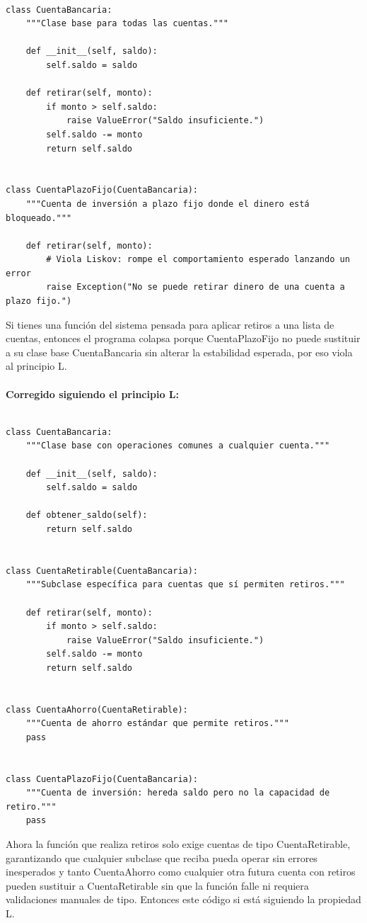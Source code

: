 \documentclass{article}
\begin{document}
        		\begin{verbatim}

class CuentaBancaria:
    """Clase base para todas las cuentas."""

    def __init__(self, saldo):
        self.saldo = saldo

    def retirar(self, monto):
        if monto > self.saldo:
            raise ValueError("Saldo insuficiente.")
        self.saldo -= monto
        return self.saldo


class CuentaPlazoFijo(CuentaBancaria):
    """Cuenta de inversión a plazo fijo donde el dinero está bloqueado."""

    def retirar(self, monto):
        # Viola Liskov: rompe el comportamiento esperado lanzando un error
        raise Exception("No se puede retirar dinero de una cuenta a plazo fijo.")

        		\end{verbatim}
        		Si tienes una función del sistema pensada para aplicar retiros a una lista de cuentas, entonces el programa colapsa porque CuentaPlazoFijo no puede sustituir a su clase base CuentaBancaria sin alterar la estabilidad esperada, por eso viola al principio L.\\ \\
        		\textbf{Corregido siguiendo el principio L:}
        		\begin{verbatim}

class CuentaBancaria:
    """Clase base con operaciones comunes a cualquier cuenta."""

    def __init__(self, saldo):
        self.saldo = saldo

    def obtener_saldo(self):
        return self.saldo


class CuentaRetirable(CuentaBancaria):
    """Subclase específica para cuentas que sí permiten retiros."""

    def retirar(self, monto):
        if monto > self.saldo:
            raise ValueError("Saldo insuficiente.")
        self.saldo -= monto
        return self.saldo


class CuentaAhorro(CuentaRetirable):
    """Cuenta de ahorro estándar que permite retiros."""
    pass


class CuentaPlazoFijo(CuentaBancaria):
    """Cuenta de inversión: hereda saldo pero no la capacidad de retiro."""
    pass

        		\end{verbatim}
        			Ahora la función que realiza retiros solo exige cuentas de tipo CuentaRetirable, garantizando que cualquier 
					subclase que reciba pueda operar sin errores inesperados y tanto CuentaAhorro como cualquier otra futura cuenta con 
					retiros pueden sustituir a CuentaRetirable sin que la función falle ni requiera validaciones manuales de tipo.
					 Entonces este código si está siguiendo la propiedad L.
    \newpage
\end{document}
